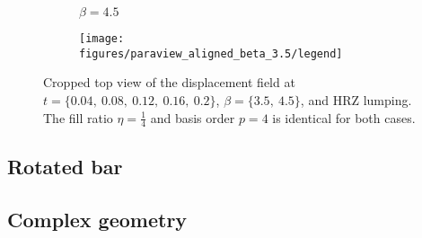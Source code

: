 \begin{figure}[!h]
\begin{subfigure}[b]{0.45\textwidth}
		\centering
		\caption{$\beta=4.5$}
	\end{subfigure}
	\begin{subfigure}[b]{0.95\textwidth}
		\centering
		\texttt{[image: figures/paraview\_aligned\_beta\_3.5/legend]}
	\end{subfigure}
	\caption{Cropped top view of the displacement field at $t=\{0.04, \ 0.08, \ 0.12, \ 0.16, \ 0.2\}$, $\beta = \{3.5, \ 4.5\}$, and HRZ lumping. The fill ratio $\eta=\frac{1}{4}$ and basis order $p=4$ is identical for both cases.}
	\label{fig:hrz_displacement_field_beta}
\end{figure}

%
\subsection{Rotated bar}
\label{section:rotated_bar}
%



%
\subsection{Complex geometry}
\label{section:complex_geometry}
%
